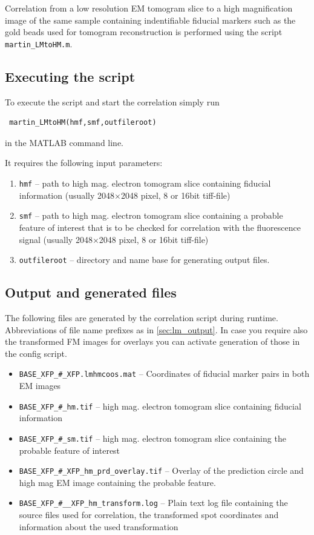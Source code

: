 \documentclass[10pt,a4paper,onepage,DIV12]{scrartcl}
\begin{document}
Correlation from a low resolution EM tomogram slice to a high magnification image of the same sample containing indentifiable fiducial markers such as the gold beads used for tomogram reconstruction is performed using the script \texttt{martin\_LMtoHM.m}.
\subsection{Executing the script}
To execute the script and start the correlation simply run \begin{verbatim}
 martin_LMtoHM(hmf,smf,outfileroot)
\end{verbatim}
 in the MATLAB command line.


It requires the following input parameters:
\begin{enumerate}
 \item\texttt{hmf} -- path to high mag. electron tomogram slice containing fiducial information (usually 2048$\times$2048 pixel, 8 or 16bit tiff-file)
 \item\texttt{smf} -- path to high mag. electron tomogram slice containing a probable feature of interest that is to be checked for correlation with the fluorescence signal (usually 2048$\times$2048 pixel, 8 or 16bit tiff-file)
 \item\texttt{outfileroot} -- directory and name base for generating output files.
\end{enumerate}
\subsection{Output and generated files}
The following files are generated by the correlation script during runtime. Abbreviations of file name prefixes as in \ref{sec:lm_output}. In case you require also the transformed FM images for overlays you can activate generation of those in the config script.
\begin{itemize}
\item \texttt{BASE\_XFP\_\#\_XFP.lmhmcoos.mat} -- Coordinates of fiducial marker pairs in both EM images


\item \texttt{BASE\_XFP\_\#\_hm.tif} -- high mag. electron tomogram slice containing fiducial information 
\item \texttt{BASE\_XFP\_\#\_sm.tif} -- high mag. electron tomogram slice containing the probable feature of interest 
\item \texttt{BASE\_XFP\_\#\_XFP\_hm\_prd\_overlay.tif} -- Overlay of the prediction circle and high mag EM image containing the probable feature.


\item \texttt{BASE\_XFP\_\#\_\_XFP\_hm\_transform.log} -- Plain text log file containing the source files used for correlation, the transformed spot coordinates and information about the used transformation
\end{itemize}
\newpage
\end{document}

